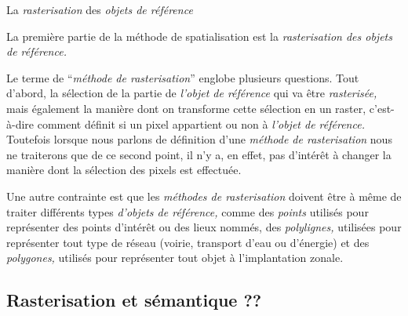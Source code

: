 La \emph{rasterisation} des \emph{objets de référence}

La première partie de la méthode de spatialisation est la
\emph{rasterisation des objets de référence.}

Le terme de \enquote{\emph{méthode de rasterisation}} englobe
plusieurs questions. Tout d'abord, la sélection de la partie de
\emph{l'objet de référence} qui va être \emph{rasterisée,} mais
également la manière dont on transforme cette sélection en un raster,
c'est-à-dire comment définit si un pixel appartient ou non à
\emph{l'objet de référence.} Toutefois lorsque nous parlons de
définition d'une \emph{méthode de rasterisation} nous ne traiterons
que de ce second point, il n'y a, en effet, pas d’intérêt à changer la
manière dont la sélection des pixels est effectuée.

Une autre contrainte est que les \emph{méthodes de rasterisation}
doivent être à même de traiter différents types \emph{d'objets de
  référence,} comme des \emph{points} utilisés pour représenter des
points d’intérêt ou des lieux nommés, des \emph{polylignes,} utilisées
pour représenter tout type de réseau (\eg voirie, transport d'eau ou
d'énergie) et des \emph{polygones,} utilisés pour représenter tout
objet à l’implantation zonale.

\subsection{Rasterisation et sémantique ??}


